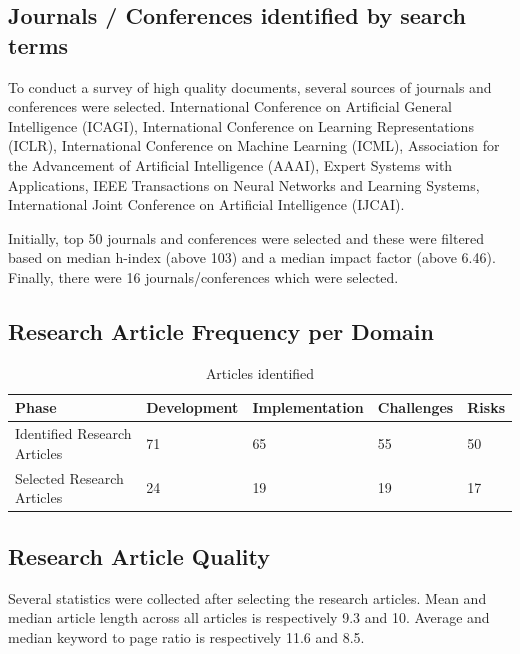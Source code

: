 \documentclass{article}
\begin{document}
\subsection{Journals / Conferences identified by search terms}

To conduct a survey of high quality documents, several sources of journals and conferences were selected. International Conference on Artificial General Intelligence (ICAGI), International Conference on Learning Representations (ICLR), International Conference on Machine Learning (ICML), Association for the Advancement of Artificial Intelligence (AAAI), Expert Systems with Applications, IEEE Transactions on Neural Networks and Learning Systems, International Joint Conference on Artificial Intelligence (IJCAI).

Initially, top 50 journals and conferences were selected and these were filtered based on median h-index (above 103) and a median impact factor (above 6.46). Finally, there were 16 journals/conferences which were selected.


\subsection{Research Article Frequency per Domain}

    \begin{table}[hbt!]
    	\caption{Articles identified}
    	\centering
        \begin{tabular}{ |p{3cm}||p{3cm}|p{3cm}|p{3cm}|p{3cm}| }
         \hline
         Phase & Development & Implementation & Challenges & Risks \\
         \hline
         Identified Research Articles & 71 & 65 & 55 & 50 \\
         \hline
         Selected Research Articles& 24 & 19 & 19 & 17 \\
         
         \hline
        \end{tabular}
    \label{tab:table3}
    \end{table}

\subsection{Research Article Quality}

Several statistics were collected after selecting the research articles.
Mean and median article length across all articles is respectively 9.3 and 10.
Average and median keyword to page ratio is respectively 11.6 and 8.5.
\end{document}
